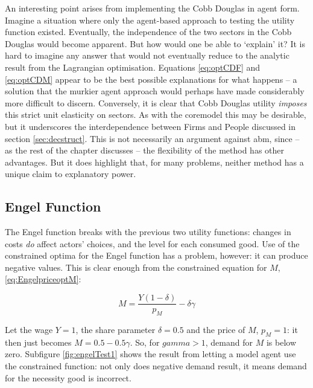 An interesting point arises from implementing the Cobb Douglas in agent form. Imagine a situation where only the agent-based approach to testing the utility function existed. Eventually, the independence of the two sectors in the Cobb Douglas would become apparent. But how would one be able to `explain’ it? It is hard to imagine any answer that would not eventually reduce to the analytic result from the Lagrangian optimisation. Equations \eqref{eq:optCDF} and \eqref{eq:optCDM} appear to be the best possible explanations for what happens – a solution that the murkier agent approach would perhaps have made considerably more difficult to discern. Conversely, it is clear that Cobb Douglas utility \emph{imposes} this strict unit elasticity on sectors. As with the \gls{coremodel} this may be desirable, but it underscores the interdependence between Firms and People discussed in section \ref{sec:decstruct}. This is not necessarily an argument against \gls{abm}, since – as the rest of the chapter discusses – the flexibility of the method has other advantages. But it does highlight that, for many problems, neither method has a unique claim to explanatory power.

\subsection{Engel Function \label{sec:engeltest}}

The Engel function breaks with the previous two utility functions: changes in costs \emph{do} affect actors' choices, and the level for each consumed good. Use of the constrained optima for the Engel function has a problem, however: it can produce negative values. This is clear enough from the constrained equation for $M$, \eqref{eq:EngelpriceoptM}:

\begin{equation}
M=\frac{Y(1-\delta)}{p_{M}}-\delta\gamma
\end{equation}
 
Let the wage $Y = 1$, the share parameter $\delta = 0.5$ and the price of $M$, $p_{M}=1$: it then just becomes $M = 0.5 - 0.5\gamma$. So, for $gamma > 1$, demand for $M$ is below zero. Subfigure \ref{fig:engelTest1} shows the result from letting a model agent use the constrained function: not only does negative demand result, it means demand for the necessity good is incorrect.

